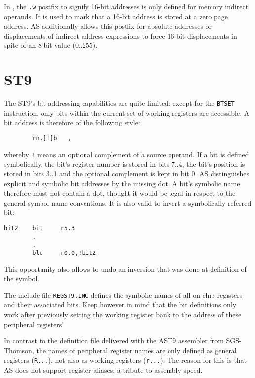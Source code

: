 \documentclass[12pt,twoside]{report}
\newcommand{\tty}[1]{{\tt #1}}
\begin{document}
In \cite{ST7Man}, the \tty{.w} postfix to signify 16-bit addresses is only
defined for memory indirect operands.  It is used to mark that a
16-bit address is stored at a zero page address.  AS additionally
allows this postfix for absolute addresses or displacements of
indirect address expressions to force 16-bit displacements in spite
of an 8-bit value (0..255).


\section{ST9}

The ST9's bit addressing capabilities are quite limited: except for
the \tty{BTSET} instruction, only bits within the current set of working
registers are accessible.  A bit address is therefore of the
following style:
\begin{verbatim}
        rn.[!]b   ,
\end{verbatim}
whereby \tty{!} means an optional complement of a source operand.  If a bit
is defined symbolically, the bit's register number is stored in bits
7..4, the bit's position is stored in bits 3..1 and the optional
complement is kept in bit 0.  AS distinguishes explicit and symbolic
bit addresses by the missing dot.  A bit's symbolic name therefore
must not contain a dot, thought it would be legal in respect to the
general symbol name conventions.  It is also valid to invert a
symbolically referred bit:
\begin{verbatim}
bit2    bit     r5.3  
        .
        .
        bld     r0.0,!bit2
\end{verbatim}
This opportunity also allows to undo an inversion that was done at
definition of the symbol.

The include file \tty{REGST9.INC} defines the symbolic names of all on-chip
registers and their associated bits. Keep however in mind that the
bit definitions only work after previously setting the working
register bank to the address of these peripheral registers!

In contrast to the definition file delivered with the AST9 assembler
from SGS-Thomson, the names of peripheral register names are only
defined as general registers (\tty{R...}), not also as working registers
(\tty{r...}).  The reason for this is that AS does not support register
aliases; a tribute to assembly speed.

\end{document}
